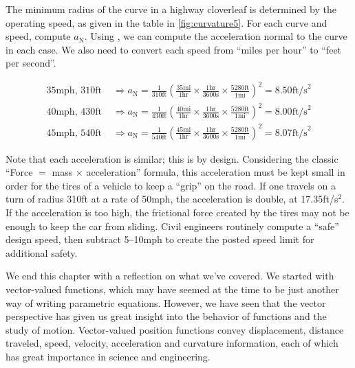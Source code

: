 \begin{example}\label{ex_curvature5}%
The minimum radius of the curve in a highway cloverleaf is determined by the operating speed, as given in the table in \autoref{fig:curvature5}. For each curve and speed, compute $a_{\mathrm{N}}$.
\solution
{}
Using , we can compute the acceleration normal to the curve in each case. We also need to convert each speed from ``miles per hour'' to ``feet per second''.

\begin{align*}
 \text{35mph, 310ft }
 &\Rightarrow a_{\mathrm{N}}
 =\frac1{310\text{ft}}\left(\frac{35\text{mi}}{1\text{hr}}\times\frac{1\text{hr}}{3600\text{s}}\times\frac{5280\text{ft}}{1\text{mi}}\right)^2
 =8.50\text{ft/s}^2\\
 \text{40mph, 430ft }
 &\Rightarrow a_{\mathrm{N}}
 =\frac1{430\text{ft}}\left(\frac{40\text{mi}}{1\text{hr}}\times\frac{1\text{hr}}{3600\text{s}}\times\frac{5280\text{ft}}{1\text{mi}}\right)^2
 =8.00\text{ft/s}^2\\
 \text{45mph, 540ft }
 &\Rightarrow a_{\mathrm{N}}
 =\frac1{540\text{ft}}\left(\frac{45\text{mi}}{1\text{hr}}\times\frac{1\text{hr}}{3600\text{s}}\times\frac{5280\text{ft}}{1\text{mi}}\right)^2
 =8.07\text{ft/s}^2
\end{align*}

Note that each acceleration is similar; this is by design. Considering the classic ``Force $=$ mass $\times$ acceleration'' formula, this acceleration must be kept small in order for the tires of a vehicle to keep a ``grip'' on the road. If one travels on a turn of radius 310ft at a rate of 50mph, the acceleration is double, at 17.35ft/s$^2$. If the acceleration is too high, the frictional force created by the tires may not be enough to keep the car from sliding. Civil engineers routinely compute a ``safe'' design speed, then subtract 5--10mph to create the posted speed limit for additional safety.
\end{example}


We end this chapter with a reflection on what we've covered. We started with vector-valued functions, which may have seemed at the time to be just another way of writing parametric equations. However, we have seen that the vector perspective has given us great insight into the behavior of functions and the study of motion. Vector-valued position functions convey displacement, distance traveled, speed, velocity, acceleration and curvature information, each of which has great importance in science and engineering.

